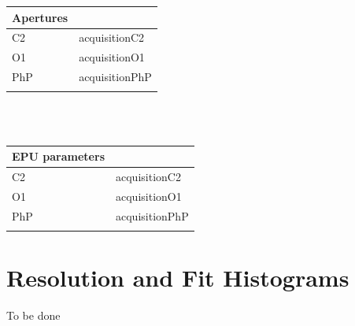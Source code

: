 \documentclass[12pt,a4paper]{article}
\begin{document}
%
  \hspace{1cm}
%
\begin{tabulary}{\linewidth}{L L}
  \\\hline
  Apertures &  \\\hline
  C2 & acquisitionC2 \\\hline
  O1 & acquisitionO1 \\\hline
  PhP & acquisitionPhP \\\hline
  &\\
\end{tabulary}\\\\
\newline
\begin{tabulary}{\linewidth}{L L}
  \\\hline
  EPU parameters &  \\\hline
  C2 & acquisitionC2 \\\hline
  O1 & acquisitionO1 \\\hline
  PhP & acquisitionPhP \\\hline
  &\\
\end{tabulary}

\newpage
\section*{Resolution and Fit Histograms}

To be done


\end{document}
